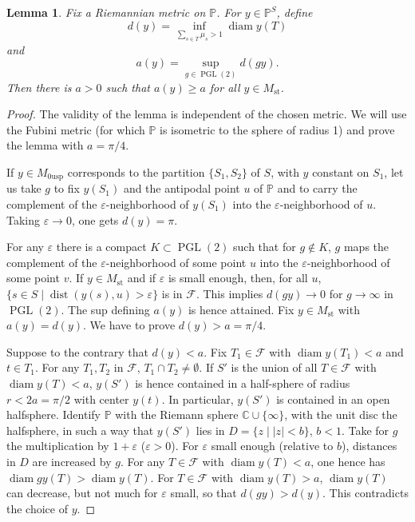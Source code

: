 \documentclass[12pt,a4paper]{article}
\theoremstyle{plain}
\newtheorem{lemma}[theorem]{Lemma}
\theoremstyle{definition}
\theoremstyle{remark}
\DeclareMathOperator{\diam}{diam}
\DeclareMathOperator{\PGL}{PGL}
\newcommand{\CC}{\mathbb{C}}
\newcommand{\PP}{\mathbb{P}}
\numberwithin{equation}{section}
\providecommand{\CC}{\mathbb{C}}
\providecommand{\PP}{\mathbb{P}}
\providecommand{\PGL}{\operatorname{PGL}}
\providecommand{\na}{a}
\providecommand{\dist}{\operatorname{dist}}
\begin{document}
\begin{lemma}\label{lem:4.4.1}
Fix a Riemannian metric on $\PP$. For $y \in \PP^S$, define
\[
d(y) = \inf_{\sum_{s \in T} \mu_s > 1} \diam y(T)
\]
and
\[
a(y) = \sup_{g \in \PGL(2)} d(gy).
\]
Then there is $a > 0$ such that $\na(y) \geq a$ for all $y \in M_{\mathrm{st}}$.
\end{lemma}

\begin{proof}
The validity of the lemma is independent of the chosen metric. We will use the Fubini metric (for which $\PP$ is isometric to the sphere of radius 1) and prove the lemma with $a = \pi/4$.

If $y \in M_{0\mathrm{usp}}$ corresponds to the partition $\{S_1, S_2\}$ of $S$, with $y$ constant on $S_1$, let us take $g$ to fix $y(S_1)$ and the antipodal point $u$ of $\PP$ and to carry the complement of the $\varepsilon$-neighborhood of $y(S_1)$ into the $\varepsilon$-neighborhood of $u$. Taking $\varepsilon \to 0$, one gets $d(y) = \pi$.

For any $\varepsilon$ there is a compact $K \subset \PGL(2)$ such that for $g \notin K$, $g$ maps the complement of the $\varepsilon$-neighborhood of some point $u$ into the $\varepsilon$-neighborhood of some point $v$. If $y \in M_{\mathrm{st}}$ and if $\varepsilon$ is small enough, then, for all $u$, $\{s \in S \mid \dist(y(s), u) > \varepsilon\}$ is in $\mathscr{F}$. This implies $d(gy) \to 0$ for $g \to \infty$ in $\PGL(2)$. The sup defining $\na(y)$ is hence attained. Fix $y \in M_{\mathrm{st}}$ with $\na(y) = d(y)$. We have to prove $d(y) > a = \pi/4$.

Suppose to the contrary that $d(y) < a$. Fix $T_1 \in \mathscr{F}$ with $\diam y(T_1) < a$ and $t \in T_1$. For any $T_1, T_2$ in $\mathscr{F}$, $T_1 \cap T_2 \neq \emptyset$. If $S'$ is the union of all $T \in \mathscr{F}$ with $\diam y(T) < a$, $y(S')$ is hence contained in a half-sphere of radius $r < 2a = \pi/2$ with center $y(t)$. In particular, $y(S')$ is contained in an open halfsphere. Identify $\PP$ with the Riemann sphere $\CC \cup \{\infty\}$, with the unit disc the halfsphere, in such a way that $y(S')$ lies in $D = \{z \mid |z| < b\}$, $b < 1$. Take for $g$ the multiplication by $1 + \varepsilon$ ($\varepsilon > 0$). For $\varepsilon$ small enough (relative to $b$), distances in $D$ are increased by $g$. For any $T \in \mathscr{F}$ with $\diam y(T) < a$, one hence has $\diam gy(T) > \diam y(T)$. For $T \in \mathscr{F}$ with $\diam y(T) > a$, $\diam y(T)$ can decrease, but not much for $\varepsilon$ small, so that $d(gy) > d(y)$. This contradicts the choice of $y$.
\end{proof}
\end{document}
